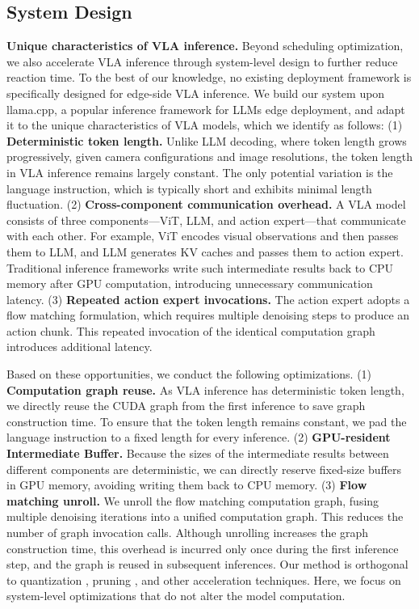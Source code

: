 \subsection{System Design}

\textbf{Unique characteristics of VLA inference.}
Beyond scheduling optimization, we also accelerate VLA inference through system-level design to further reduce reaction time. To the best of our knowledge, no existing deployment framework is specifically designed for edge-side VLA inference. We build our system upon llama.cpp, a popular inference framework for LLMs edge deployment, and adapt it to the unique characteristics of VLA models, which we identify as follows:
(1) \textbf{Deterministic token length.} Unlike LLM decoding, where token length grows progressively, given camera configurations and image resolutions, the token length in VLA inference remains largely constant. The only potential variation is the language instruction, which is typically short and exhibits minimal length fluctuation.
(2) \textbf{Cross-component communication overhead.} A VLA model consists of three components—ViT, LLM, and action expert—that communicate with each other. For example, ViT encodes visual observations and then passes them to LLM, and LLM generates KV caches and passes them to action expert. Traditional inference frameworks write such intermediate results back to CPU memory after GPU computation, introducing unnecessary communication latency.
(3) \textbf{Repeated action expert invocations.} The action expert adopts a flow matching formulation, which requires multiple denoising steps to produce an action chunk. This repeated invocation of the identical computation graph introduces additional latency.

Based on these opportunities, we conduct the following optimizations.
(1) \textbf{Computation graph reuse.} As VLA inference has deterministic token length, we directly reuse the CUDA graph from the first inference to save graph construction time. To ensure that the token length remains constant, we pad the language instruction to a fixed length for every inference.
(2) \textbf{GPU-resident Intermediate Buffer.} Because the sizes of the intermediate results between different components are deterministic, we can directly reserve fixed-size buffers in GPU memory, avoiding writing them back to CPU memory.
(3) \textbf{Flow matching unroll.} We unroll the flow matching computation graph, fusing multiple denoising iterations into a unified computation graph. This reduces the number of graph invocation calls. Although unrolling increases the graph construction time, this overhead is incurred only once during the first inference step, and the graph is reused in subsequent inferences.
Our method is orthogonal to quantization \cite{zhang2026quantvla,zheng2026dyq,park2024quantization,xu2026qvla}, pruning \cite{wang2025specprune,jiang2025better,yang2026efficientvla}, and other acceleration techniques. Here, we focus on system-level optimizations that do not alter the model computation.






